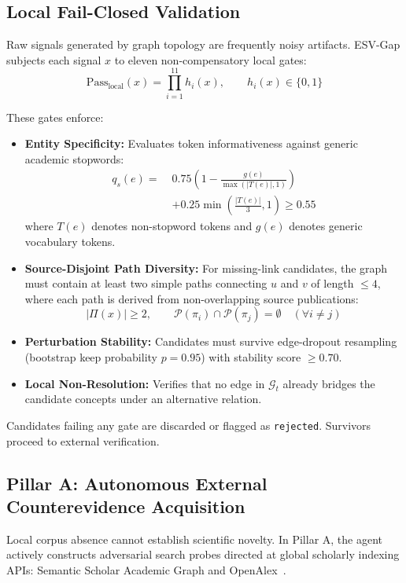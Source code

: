 \documentclass[conference,10pt]{IEEEtran}
\newcommand{\method}{ESV-Gap}
\begin{document}
\subsection{Local Fail-Closed Validation}
Raw signals generated by graph topology are frequently noisy artifacts. \method{} subjects each signal $x$ to eleven non-compensatory local gates:
\begin{equation}
\mathrm{Pass}_{\text{local}}(x) = \prod_{i=1}^{11} h_i(x), \qquad h_i(x) \in \{0, 1\}
\end{equation}

These gates enforce:
\begin{itemize}[leftmargin=1.5em]
  \item \textbf{Entity Specificity:} Evaluates token informativeness against generic academic stopwords:
    \begin{equation}
    \begin{aligned}
    q_s(e) = \; &0.75 \left(1 - \frac{g(e)}{\max(|T(e)|, 1)}\right) \\
                &+ 0.25 \min\left(\frac{|T(e)|}{3}, 1\right) \ge 0.55
    \end{aligned}
    \end{equation}
    where $T(e)$ denotes non-stopword tokens and $g(e)$ denotes generic vocabulary tokens.
  \item \textbf{Source-Disjoint Path Diversity:} For missing-link candidates, the graph must contain at least two simple paths connecting $u$ and $v$ of length $\le 4$, where each path is derived from non-overlapping source publications:
    \begin{equation}
    |\Pi(x)| \ge 2, \qquad \mathcal{P}(\pi_i) \cap \mathcal{P}(\pi_j) = \emptyset \quad (\forall i \neq j)
    \end{equation}
  \item \textbf{Perturbation Stability:} Candidates must survive edge-dropout resampling (bootstrap keep probability $p = 0.95$) with stability score $\ge 0.70$.
  \item \textbf{Local Non-Resolution:} Verifies that no edge in $\mathcal{G}_t$ already bridges the candidate concepts under an alternative relation.
\end{itemize}

Candidates failing any gate are discarded or flagged as \texttt{rejected}. Survivors proceed to external verification.

\subsection{Pillar A: Autonomous External Counterevidence Acquisition}
Local corpus absence cannot establish scientific novelty. In Pillar A, the agent actively constructs adversarial search probes directed at global scholarly indexing APIs: Semantic Scholar Academic Graph and OpenAlex~\cite{openalex,semanticscholar}.
\end{document}
